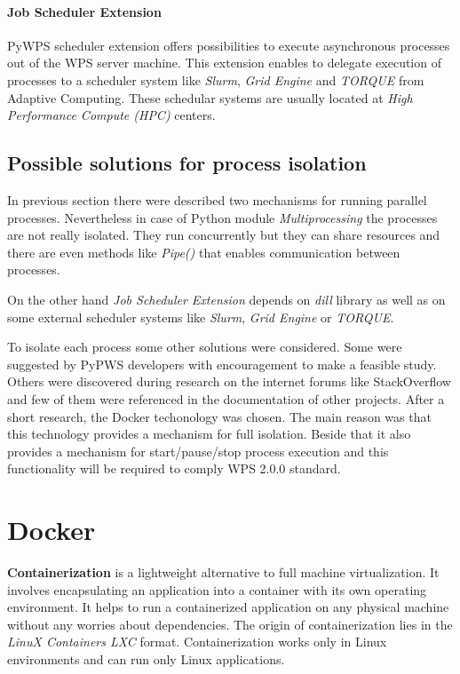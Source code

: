 \documentclass{gifce}
\begin{document}
\paragraph{Job Scheduler Extension}
PyWPS scheduler extension offers possibilities to execute asynchronous processes out of the WPS server machine.
This extension enables to delegate execution of processes to a scheduler system like \textit{Slurm}, \textit{Grid Engine} 
and \textit{TORQUE} from Adaptive Computing. These schedular systems are usually located at \textit{High Performance Compute (HPC)}
centers.

\subsection{Possible solutions for process isolation}
In previous section there were described two mechanisms for running parallel processes. Nevertheless in case of Python module
\textit{Multiprocessing} the processes are not really isolated. They run concurrently but they can share resources and there are 
even methods like \textit{Pipe()} that enables communication between processes.

On the other hand \textit{Job Scheduler Extension} depends on
\textit{dill} library as well as on some external scheduler systems
like \textit{Slurm}, \textit{Grid Engine} or \textit{TORQUE}.

\bigskip
To isolate each process some other solutions were considered. 
Some were suggested by PyPWS developers with encouragement to make a feasible study. Others were discovered
during research on the internet forums like StackOverflow and few of
them were referenced in the documentation of other projects. After a short research, the Docker techonology
was chosen. The main reason was that this technology provides a mechanism for full isolation. Beside that
it also provides a mechanism for start/pause/stop process execution and this functionality
will be required to comply WPS 2.0.0 standard.

\section{Docker}
\textbf{Containerization} is a lightweight alternative to full machine virtualization. It involves encapsulating an application 
into a container with its own operating environment. It helps to run a containerized application on any physical machine without any
worries about dependencies. The origin of containerization lies in the \textit{LinuX Containers {LXC}} format. Containerization works only in Linux environments and can run only Linux applications.
\end{document}
